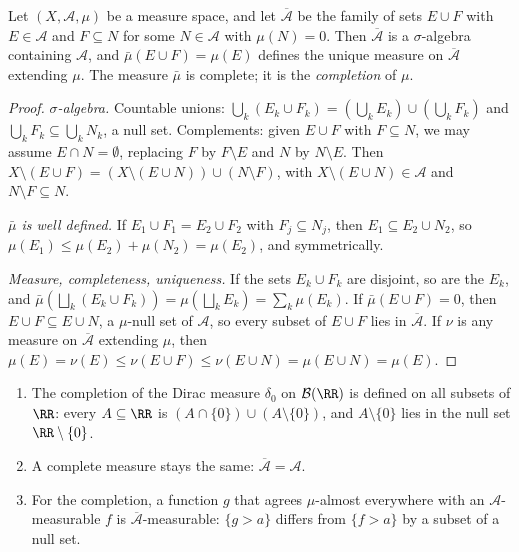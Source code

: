 \begin{theorem}\label{measure-theory:theorem-completion}
Let $(X, \mathcal{A}, \mu)$ be a measure space, and let $\overline{\mathcal{A}}$ be the family of sets $E \cup F$ with $E \in \mathcal{A}$ and $F \subseteq N$ for some $N \in \mathcal{A}$ with
$\mu(N) = 0$. Then $\overline{\mathcal{A}}$ is a $\sigma$-algebra containing $\mathcal{A}$, and $\bar\mu(E \cup F) = \mu(E)$ defines the unique measure on $\overline{\mathcal{A}}$ extending $\mu$. The
measure $\bar\mu$ is complete; it is the \emph{completion} of $\mu$.
\end{theorem}

\begin{proof}
\emph{$\sigma$-algebra.} Countable unions: $\bigcup_k(E_k \cup F_k) = (\bigcup_kE_k) \cup (\bigcup_kF_k)$ and $\bigcup_kF_k \subseteq \bigcup_kN_k$, a null set. Complements: given $E \cup F$ with
$F \subseteq N$, we may assume $E \cap N = \emptyset$, replacing $F$ by $F \setminus E$ and $N$ by $N \setminus E$. Then
$X \setminus (E \cup F) = (X \setminus (E \cup N)) \cup (N \setminus F)$, with $X \setminus (E \cup N) \in \mathcal{A}$ and $N \setminus F \subseteq N$.

\emph{$\bar\mu$ is well defined.} If $E_1 \cup F_1 = E_2 \cup F_2$ with $F_j \subseteq N_j$, then $E_1 \subseteq E_2 \cup N_2$, so $\mu(E_1) \leq \mu(E_2) + \mu(N_2) = \mu(E_2)$, and symmetrically.

\emph{Measure, completeness, uniqueness.} If the sets $E_k \cup F_k$ are disjoint, so are the $E_k$, and $\bar\mu(\bigsqcup_k(E_k \cup F_k)) = \mu(\bigsqcup_kE_k) = \sum_k\mu(E_k)$. If
$\bar\mu(E \cup F) = 0$, then $E \cup F \subseteq E \cup N$, a $\mu$-null set of $\mathcal{A}$, so every subset of $E \cup F$ lies in $\overline{\mathcal{A}}$. If $\nu$ is any measure on
$\overline{\mathcal{A}}$ extending $\mu$, then $\mu(E) = \nu(E) \leq \nu(E \cup F) \leq \nu(E \cup N) = \mu(E \cup N) = \mu(E)$.
\end{proof}

\begin{example}\label{measure-theory:example-completion}
\begin{enumerate}
\item The completion of the Dirac measure $\delta_0$ on $\mathcal{B}(\RR)$ is defined on all subsets of $\RR$: every $A \subseteq \RR$ is $(A \cap \{0\}) \cup (A \setminus \{0\})$, and
$A \setminus \{0\}$ lies in the null set $\RR \setminus \{0\}$.
\item A complete measure stays the same: $\overline{\mathcal{A}} = \mathcal{A}$.
\item For the completion, a function $g$ that agrees $\mu$-almost everywhere with an $\mathcal{A}$-measurable $f$ is $\overline{\mathcal{A}}$-measurable: $\{g > a\}$ differs from $\{f > a\}$ by a subset of
a null set.
\end{enumerate}
\end{example}

